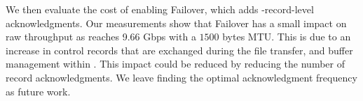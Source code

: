 
We then evaluate the cost of enabling Failover, which adds \tcpls-record-level 
acknowledgments. %
Our measurements show that Failover has a small impact on raw throughput as
\tcpls reaches 9.66 Gbps with a $1500$ bytes MTU.
This is due to an increase in control records that are exchanged during the file 
transfer, and buffer management within \tcpls.
This impact could be reduced by reducing the number of record acknowledgments. We 
leave finding the optimal acknowledgment frequency as future work.



